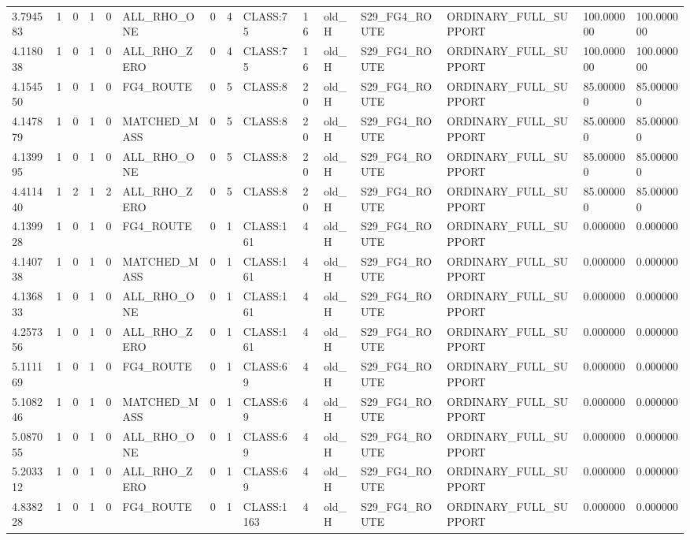 \begin{tabular}{lllllllllllllll}
3.794583 & 1 & 0 & 1 & 0 & ALL\_RHO\_ONE & 0 & 4 & CLASS:75 & 16 & old\_H & S29\_FG4\_ROUTE & ORDINARY\_FULL\_SUPPORT & 100.000000 & 100.000000 \\
4.118038 & 1 & 0 & 1 & 0 & ALL\_RHO\_ZERO & 0 & 4 & CLASS:75 & 16 & old\_H & S29\_FG4\_ROUTE & ORDINARY\_FULL\_SUPPORT & 100.000000 & 100.000000 \\
4.154550 & 1 & 0 & 1 & 0 & FG4\_ROUTE & 0 & 5 & CLASS:8 & 20 & old\_H & S29\_FG4\_ROUTE & ORDINARY\_FULL\_SUPPORT & 85.000000 & 85.000000 \\
4.147879 & 1 & 0 & 1 & 0 & MATCHED\_MASS & 0 & 5 & CLASS:8 & 20 & old\_H & S29\_FG4\_ROUTE & ORDINARY\_FULL\_SUPPORT & 85.000000 & 85.000000 \\
4.139995 & 1 & 0 & 1 & 0 & ALL\_RHO\_ONE & 0 & 5 & CLASS:8 & 20 & old\_H & S29\_FG4\_ROUTE & ORDINARY\_FULL\_SUPPORT & 85.000000 & 85.000000 \\
4.411440 & 1 & 2 & 1 & 2 & ALL\_RHO\_ZERO & 0 & 5 & CLASS:8 & 20 & old\_H & S29\_FG4\_ROUTE & ORDINARY\_FULL\_SUPPORT & 85.000000 & 85.000000 \\
4.139928 & 1 & 0 & 1 & 0 & FG4\_ROUTE & 0 & 1 & CLASS:161 & 4 & old\_H & S29\_FG4\_ROUTE & ORDINARY\_FULL\_SUPPORT & 0.000000 & 0.000000 \\
4.140738 & 1 & 0 & 1 & 0 & MATCHED\_MASS & 0 & 1 & CLASS:161 & 4 & old\_H & S29\_FG4\_ROUTE & ORDINARY\_FULL\_SUPPORT & 0.000000 & 0.000000 \\
4.136833 & 1 & 0 & 1 & 0 & ALL\_RHO\_ONE & 0 & 1 & CLASS:161 & 4 & old\_H & S29\_FG4\_ROUTE & ORDINARY\_FULL\_SUPPORT & 0.000000 & 0.000000 \\
4.257356 & 1 & 0 & 1 & 0 & ALL\_RHO\_ZERO & 0 & 1 & CLASS:161 & 4 & old\_H & S29\_FG4\_ROUTE & ORDINARY\_FULL\_SUPPORT & 0.000000 & 0.000000 \\
5.111169 & 1 & 0 & 1 & 0 & FG4\_ROUTE & 0 & 1 & CLASS:69 & 4 & old\_H & S29\_FG4\_ROUTE & ORDINARY\_FULL\_SUPPORT & 0.000000 & 0.000000 \\
5.108246 & 1 & 0 & 1 & 0 & MATCHED\_MASS & 0 & 1 & CLASS:69 & 4 & old\_H & S29\_FG4\_ROUTE & ORDINARY\_FULL\_SUPPORT & 0.000000 & 0.000000 \\
5.087055 & 1 & 0 & 1 & 0 & ALL\_RHO\_ONE & 0 & 1 & CLASS:69 & 4 & old\_H & S29\_FG4\_ROUTE & ORDINARY\_FULL\_SUPPORT & 0.000000 & 0.000000 \\
5.203312 & 1 & 0 & 1 & 0 & ALL\_RHO\_ZERO & 0 & 1 & CLASS:69 & 4 & old\_H & S29\_FG4\_ROUTE & ORDINARY\_FULL\_SUPPORT & 0.000000 & 0.000000 \\
4.838228 & 1 & 0 & 1 & 0 & FG4\_ROUTE & 0 & 1 & CLASS:1163 & 4 & old\_H & S29\_FG4\_ROUTE & ORDINARY\_FULL\_SUPPORT & 0.000000 & 0.000000 \\

\end{tabular}
